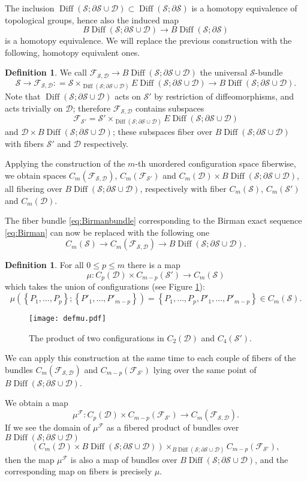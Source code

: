 \documentclass{amsart}
\theoremstyle{plain}
\theoremstyle{definition}
\newtheorem{defn}[thm]  {Definition}
\newcommand{\D}{\mathcal{D}}
\newcommand{\cF}{\mathcal{F}}
\renewcommand{\S}{\mathcal{S}}
\newcommand{\cms}{C_m(\S)}
\newcommand{\pa}[1]{\left(#1\right)}
\newcommand{\set}[1]{\left\{#1\right\}}
\DeclareMathOperator{\Diff}{Diff}
\begin{document}
The inclusion $\Diff(\S;\partial\S\cup\D)\subset\Diff(\S;\partial\S)$ is a homotopy
equivalence of topological groups, hence also the induced map
\[
B\Diff(\S;\partial\S\cup\D)\to B\Diff(\S;\partial\S)
\]
is a homotopy equivalence. We will replace the previous construction with the following,
homotopy equivalent ones.
\begin{defn}
\label{defn:universalSbundle}
We call $\cF_{\S,\D}\to B\Diff(\S;\partial\S\cup\D)$
the universal $\S$-bundle
 \[
  \S\to\cF_{\S,\D}\colon=\S\times_{\Diff(\S;\partial\S\cup\D)}E\Diff(\S;\partial\S\cup\D)\to B\Diff(\S;\partial\S\cup\D).
 \]
Note that $\Diff(\S;\partial\S\cup\D)$ acts on $\S'$ by restriction of diffeomorphisms, and acts trivially
on $\D$; therefore $\cF_{\S,\D}$ contains subspaces
\[
 \cF_{\S'}= \S'\times_{\Diff(\S;\partial\S\cup\D)}E\Diff(\S;\partial\S\cup\D)
\]
and $\D\times B\Diff(\S;\partial\S\cup\D)$; these subspaces fiber over $B\Diff(\S;\partial\S\cup\D)$
with fibers $\S'$ and $\D$ respectively.

Applying the construction of the $m$-th unordered configuration space fiberwise, we obtain spaces
$C_m(\cF_{\S,\D})$, $C_m(\cF_{\S'})$ and $C_m(\D)\times B\Diff(\S;\partial\S\cup\D)$,
all fibering over $B\Diff(\S;\partial\S\cup\D)$, respectively with fiber $\cms$,
$C_m(\S')$ and $C_m(\D)$.
\end{defn}
The fiber bundle \eqref{eq:Birmanbundle} corresponding to the Birman exact sequence \eqref{eq:Birman}
can now be replaced with the following one
\begin{equation}\label{eq:BirmanbundleD}
\cms\to C_m(\cF_{\S,\D})\to B\Diff(\S;\partial\S\cup\D).
\end{equation}

\begin{defn}
\label{defn:muF}
For all $0\leq p\leq m$ there is a map
\[
 \mu\colon C_p(\D)\times C_{m-p}(\S')\to \cms
\]
which takes the union of configurations (see Figure \ref{fig:defmu}):
 \[
  \mu\pa{\set{P_1,\dots,P_p};\set{P'_1,\dots,P'_{m-p}}}=\set{P_1,\dots,P_p,P'_1,\dots,P'_{m-p}}\in\cms.
 \]
\begin{figure}[ht]\centering
 \texttt{[image: defmu.pdf]}
 \caption{The product of two configurations in $C_2(\D)$ and $C_4(\S')$.}
\label{fig:defmu}
\end{figure}
 
We can apply this construction at the same time to each couple of fibers of the bundles $C_m(\cF_{\S,\D})$ and $C_{m-p}(\cF_{\S'})$
lying over the same point of $ B\Diff(\S;\partial\S\cup\D)$.

We obtain a map
\[
 \mu^{\cF}\colon C_p(\D)\times C_{m-p}(\cF_{\S'})\to C_m(\cF_{\S,\D}).
\]
If we see the domain of $\mu^{\cF}$ as a fibered product of bundles over $B\Diff(\S;\partial\S\cup\D)$
\[
 \pa{C_m(\D)\times B\Diff(\S;\partial\S\cup\D)}\times_{B\Diff(\S;\partial\S\cup\D)}C_{m-p}(\cF_{\S'}),
\]
then the map $\mu^{\cF}$ is also a map of bundles over $B\Diff(\S;\partial\S\cup\D)$, and the corresponding
map on fibers is precisely $\mu$.
\end{defn}
\end{document}
